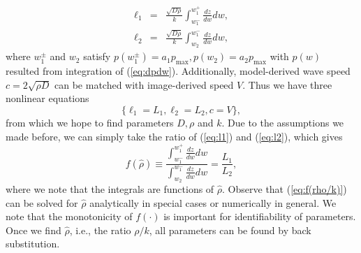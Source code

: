\documentclass{aims}
\numberwithin{equation}{section}
\begin{document}
\begin{subequations}
\begin{eqnarray}
\ell_{1} & = & \frac{\sqrt{D\rho}}{k}\int_{w_{1}^{-}}^{w_{1}^{+}}\frac{dz}{dw}dw,\label{eq:l1}\\
\ell_{2} & = & \frac{\sqrt{D\rho}}{k}\int_{w_{2}}^{w_{1}^{-}}\frac{dz}{dw}dw,\label{eq:l2}
\end{eqnarray}
\end{subequations}
where $w_{1}^{\pm}$ and $w_{2}$ satisfy $p(w_{1}^{\pm})=a_{1}p_{\text{max}},p(w_{2})=a_{2}p_{\max}$ with $p(w)$ resulted from integration of (\ref{eq:dpdw}). Additionally, model-derived wave
speed $c=2\sqrt{\rho D}$ can be matched with image-derived speed
$V$. Thus we have three nonlinear equations
\begin{equation}
\{\ell_{1}=L_{1},\ell_{2}=L_{2},c=V\},\label{eq:l1l2c}
\end{equation}
from which we hope to find parameters $D,\rho$ and $k$. Due
to the assumptions we made before, we can simply take the ratio of
(\ref{eq:l1}) and (\ref{eq:l2}), which gives
\begin{equation}
f(\hat{\rho})\equiv\frac{\int_{w_{1}^{-}}^{w_{1}^{+}}\frac{dz}{dw}dw}{\int_{w_{2}}^{w_{1}^{-}}\frac{dz}{dw}dw}=\frac{L_{1}}{L_{2}},\label{eq:f(rho/k)}
\end{equation}
where we note that the integrals are functions of $\hat{\rho}$. Observe that (\ref{eq:f(rho/k)})
can be solved for $\hat{\rho}$ analytically in special cases or numerically
in general. We note that the monotonicity of $f(\cdot)$ is important
for identifiability of parameters. Once we find $\hat{\rho}$, i.e., the ratio $\rho /k$, all parameters can be found by back substitution.
\end{document}
